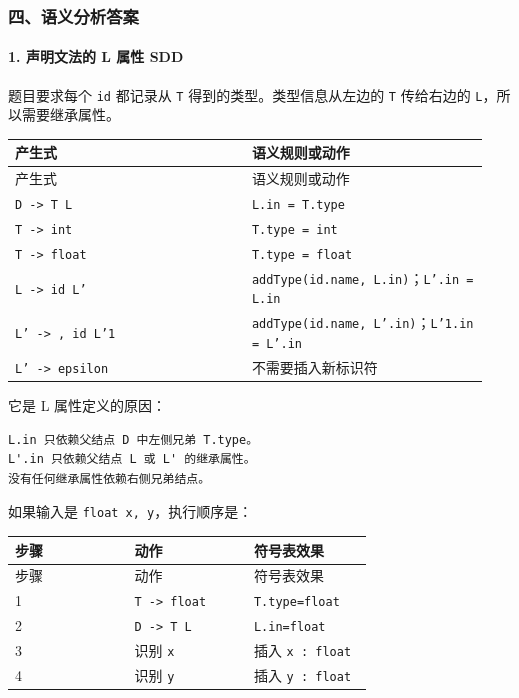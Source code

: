 \documentclass[UTF8]{ctexart}
\begin{document}
\subsubsection*{四、语义分析答案}

\paragraph*{1. 声明文法的 L 属性 SDD}

题目要求每个 \texttt{id} 都记录从 \texttt{T} 得到的类型。类型信息从左边的 \texttt{T} 传给右边的 \texttt{L}，所以需要继承属性。

\begin{longtable}{|p{0.47\linewidth}|p{0.47\linewidth}|}
\hline
产生式 & 语义规则或动作 \\
\hline
\endfirsthead
产生式 & 语义规则或动作 \\
\hline
\endhead
\texttt{D -> T L} & \texttt{L.in = T.type} \\
\hline
\texttt{T -> int} & \texttt{T.type = int} \\
\hline
\texttt{T -> float} & \texttt{T.type = float} \\
\hline
\texttt{L -> id L'} & \texttt{addType(id.name, L.in)}；\texttt{L'.in = L.in} \\
\hline
\texttt{L' -> , id L'1} & \texttt{addType(id.name, L'.in)}；\texttt{L'1.in = L'.in} \\
\hline
\texttt{L' -> epsilon} & 不需要插入新标识符 \\
\hline
\end{longtable}

它是 L 属性定义的原因：

\begin{Verbatim}[fontsize=\small,breaklines=true]
L.in 只依赖父结点 D 中左侧兄弟 T.type。
L'.in 只依赖父结点 L 或 L' 的继承属性。
没有任何继承属性依赖右侧兄弟结点。
\end{Verbatim}

如果输入是 \texttt{float x, y}，执行顺序是：

\begin{longtable}{|p{0.31\linewidth}|p{0.31\linewidth}|p{0.31\linewidth}|}
\hline
步骤 & 动作 & 符号表效果 \\
\hline
\endfirsthead
步骤 & 动作 & 符号表效果 \\
\hline
\endhead
1 & \texttt{T -> float} & \texttt{T.type=float} \\
\hline
2 & \texttt{D -> T L} & \texttt{L.in=float} \\
\hline
3 & 识别 \texttt{x} & 插入 \texttt{x : float} \\
\hline
4 & 识别 \texttt{y} & 插入 \texttt{y : float} \\
\hline
\end{longtable}
\end{document}
